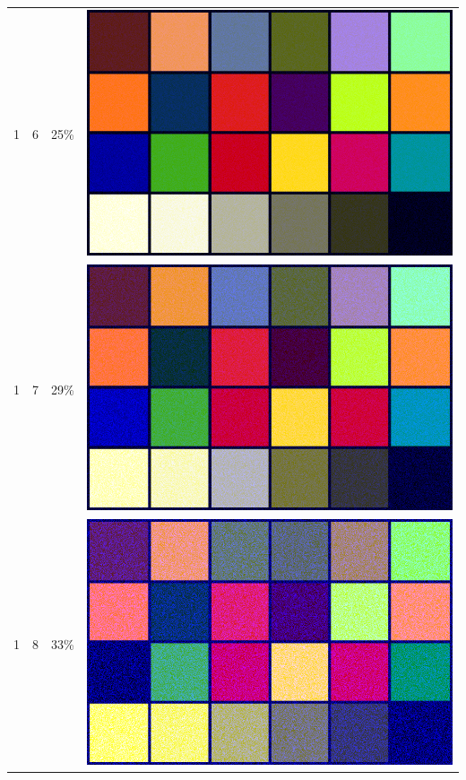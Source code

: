 \documentclass[times, utf8, seminar, numeric]{fer}
\begin{document}
\begin{center}
\begin{longtable}{|c|c|c|c|}
1 & 6 &25\% & \includegraphics[scale=0.3]{../benchmark_results/color_chart/1_components-6_bits.png} \\
1 & 7 &29\% & \includegraphics[scale=0.3]{../benchmark_results/color_chart/1_components-7_bits.png} \\
1 & 8 &33\% & \includegraphics[scale=0.3]{../benchmark_results/color_chart/1_components-8_bits.png} \\

\end{longtable}
\end{center}
\end{document}
